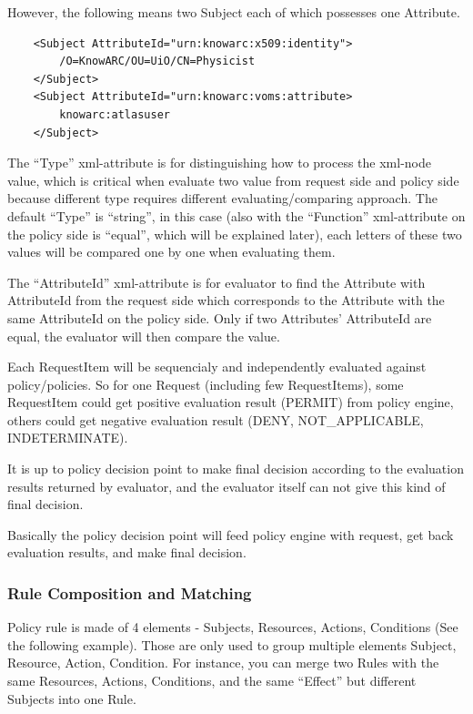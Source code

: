 \documentclass{article}                            %
\begin{document}
However, the following means two Subject each of which possesses one Attribute.

\begin{verbatim}
    <Subject AttributeId="urn:knowarc:x509:identity">
        /O=KnowARC/OU=UiO/CN=Physicist
    </Subject>
    <Subject AttributeId="urn:knowarc:voms:attribute>
        knowarc:atlasuser
    </Subject>
\end{verbatim}

The ``Type'' xml-attribute is for distinguishing how to process the xml-node value, which is critical when evaluate two value from request side and policy side because different type requires different evaluating/comparing approach. The default ``Type'' is ``string'', in this case (also with the ``Function'' xml-attribute on the policy side is ``equal'', which will be explained later), each letters of these two values will be compared one by one when evaluating them.

The ``AttributeId'' xml-attribute is for evaluator to find the Attribute with AttributeId from the request side which corresponds to the Attribute with the same AttributeId on the policy side. Only if two Attributes' AttributeId are equal, the evaluator will then compare the value.

Each RequestItem will be sequencialy and independently evaluated against policy/policies. So for one Request (including few RequestItems), some RequestItem could get positive evaluation result (PERMIT) from policy engine, others could get negative evaluation result (DENY, NOT\_APPLICABLE, INDETERMINATE).

It is up to policy decision point to make final decision according to the evaluation results returned by evaluator, and the evaluator itself can not give this kind of final decision.

Basically the policy decision point will feed policy engine with request, get back evaluation results, 
and make final decision.


\subsubsection{Rule Composition and Matching} %
\label{subsubsec:rule_comp_match}

Policy rule is made of 4 elements - Subjects, Resources, Actions, Conditions (See the following example). Those are only used to group multiple elements Subject, Resource, Action, Condition. For instance, you can merge two Rules with the same Resources, Actions, Conditions, and the same ``Effect'' but different Subjects into one Rule.
\end{document}
